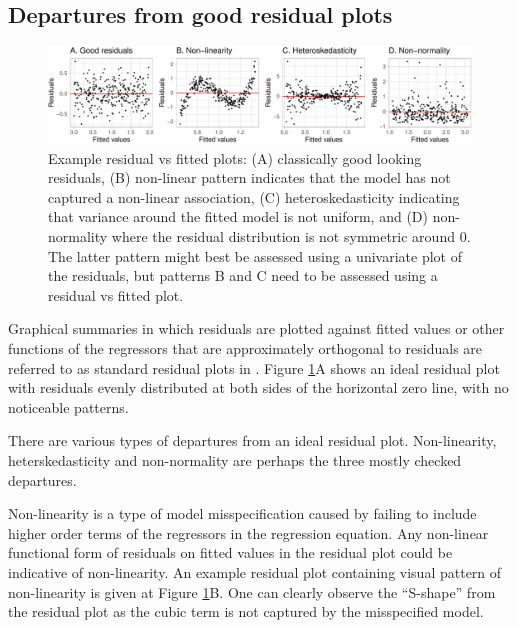 \documentclass[]{interact}
\theoremstyle{plain}%
\theoremstyle{definition}
\theoremstyle{remark}
\begin{document}
\hypertarget{departures-from-good-residual-plots}{%
\subsection{Departures from good residual
plots}\label{departures-from-good-residual-plots}}

\begin{figure}

{\centering \includegraphics[width=1\linewidth]{paper_comparison_files/figure-latex/residual-plot-common-departures-1} 

}

\caption{Example residual vs fitted plots: (A) classically good looking residuals, (B) non-linear pattern indicates that the model has not captured a non-linear association, (C) heteroskedasticity indicating that variance around the fitted model is not uniform, and (D) non-normality where the residual distribution is not symmetric around 0. The latter pattern might best be assessed using a univariate plot of the residuals, but patterns B and C need to be assessed using a residual vs fitted plot.}\label{fig:residual-plot-common-departures}
\end{figure}

Graphical summaries in which residuals are plotted against fitted values
or other functions of the regressors that are approximately orthogonal
to residuals are referred to as standard residual plots in
\citet{cook1982residuals}. Figure
\ref{fig:residual-plot-common-departures}A shows an ideal residual plot
with residuals evenly distributed at both sides of the horizontal zero
line, with no noticeable patterns.

There are various types of departures from an ideal residual plot.
Non-linearity, heterskedasticity and non-normality are perhaps the three
mostly checked departures.

Non-linearity is a type of model misspecification caused by failing to
include higher order terms of the regressors in the regression equation.
Any non-linear functional form of residuals on fitted values in the
residual plot could be indicative of non-linearity. An example residual
plot containing visual pattern of non-linearity is given at Figure
\ref{fig:residual-plot-common-departures}B. One can clearly observe the
``S-shape'' from the residual plot as the cubic term is not captured by
the misspecified model.
\end{document}
